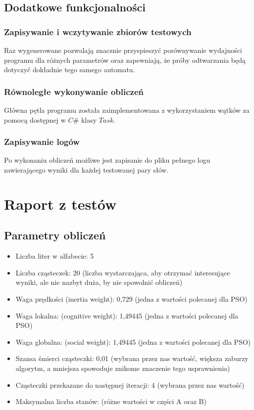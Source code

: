 \documentclass{../llncs_template_final/llncs}
\begin{document}
\subsection{Dodatkowe funkcjonalności}

\subsubsection{Zapisywanie i wczytywanie zbiorów testowych}
Raz wygenerowane pozwalają znacznie przyspieszyć porównywanie wydajności programu dla różnych parametrów oraz zapewniają, że próby odtwarzania będą dotyczyć dokładnie tego samego automatu.

\subsubsection{Równoległe wykonywanie obliczeń}
Główna pętla programu została zaimplementowana z wykorzystaniem wątków za pomocą dostępnej w $C\#$ klasy $Task$.

\subsubsection{Zapisywanie logów}
Po wykonaniu obliczeń możliwe jest zapisanie do pliku pełnego logu zawierającego wyniki dla każdej testowanej pary słów.

\newpage

\section{Raport z testów}

\subsection{Parametry obliczeń}

\begin{itemize}
\item Liczba liter w alfabecie: 5
\item Liczba cząsteczek: 20 (liczba wystarczająca, aby otrzymać interesujące wyniki, ale nie nazbyt duża, by nie spowolnić obliczeń)
\item Waga prędkości (inertia weight): 0,729 (jedna z wartości polecanej dla PSO)
\item Waga lokalna: (cognitive weight): 1,49445 (jedna z wartości polecanej dla PSO)
\item Waga globalna: (social weight): 1,49445	(jedna z wartości polecanej dla PSO)
\item Szansa śmierci cząsteczki: 0,01 (wybrana przez nas wartość, większa zaburzy algorytm, a mniejsza spowoduje znikome znaczenie tego usprawnienia)
\item Cząsteczki przekazane do następnej iteracji: 4 (wybrana przez nas wartość)
\item Maksymalna liczba stanów: (różne wartości w części A oraz B)
\end{itemize}
\end{document}

